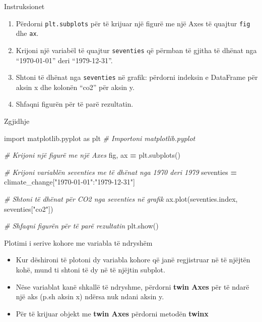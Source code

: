 \documentclass[
  ignorenonframetext,
]{beamer}
\newenvironment{Shaded}{\begin{snugshade}}{\end{snugshade}}
\newcommand{\CommentTok}[1]{\textcolor[rgb]{0.56,0.35,0.01}{\textit{#1}}}
\newcommand{\ImportTok}[1]{#1}
\newcommand{\NormalTok}[1]{#1}
\newcommand{\OperatorTok}[1]{\textcolor[rgb]{0.81,0.36,0.00}{\textbf{#1}}}
\newcommand{\StringTok}[1]{\textcolor[rgb]{0.31,0.60,0.02}{#1}}
\begin{document}
\begin{frame}[fragile]{Instruksionet}
\protect\hypertarget{instruksionet-6}{}
\begin{enumerate}
\item
  Përdorni \texttt{plt.subplots} për të krijuar një figurë me një Axes
  të quajtur \texttt{fig} dhe \texttt{ax}.
\item
  Krijoni një variabël të quajtur \texttt{seventies} që përmban të
  gjitha të dhënat nga ``1970-01-01'' deri ``1979-12-31''.
\item
  Shtoni të dhënat nga \texttt{seventies} në grafik: përdorni indeksin e
  DataFrame për aksin x dhe kolonën ``co2'' për aksin y.
\item
  Shfaqni figurën për të parë rezultatin.
\end{enumerate}
\end{frame}

\begin{frame}[fragile]{Zgjidhje}
\protect\hypertarget{zgjidhje-6}{}

\begin{Shaded}
\begin{Highlighting}[]
\ImportTok{import}\NormalTok{ matplotlib.pyplot }\ImportTok{as}\NormalTok{ plt  }\CommentTok{\# Importoni matplotlib.pyplot}

\CommentTok{\# Krijoni një figurë me një Axes}
\NormalTok{fig, ax }\OperatorTok{=}\NormalTok{ plt.subplots()}

\CommentTok{\# Krijoni variablën \textquotesingle{}seventies\textquotesingle{} me të dhënat nga 1970 deri 1979}
\NormalTok{seventies }\OperatorTok{=}\NormalTok{ climate\_change[}\StringTok{"1970{-}01{-}01"}\NormalTok{:}\StringTok{"1979{-}12{-}31"}\NormalTok{]}

\CommentTok{\# Shtoni të dhënat për CO2 nga \textquotesingle{}seventies\textquotesingle{} në grafik}
\NormalTok{ax.plot(seventies.index, seventies[}\StringTok{"co2"}\NormalTok{])}

\CommentTok{\# Shfaqni figurën për të parë rezultatin}
\NormalTok{plt.show()}
\end{Highlighting}
\end{Shaded}
\end{frame}

\begin{frame}{Plotimi i serive kohore me variabla të ndryshëm}
\protect\hypertarget{plotimi-i-serive-kohore-me-variabla-tuxeb-ndryshuxebm}{}
\begin{itemize}
\item
  Kur dëshironi të plotoni dy variabla kohore që janë regjistruar në të
  njëjtën kohë, mund ti shtoni të dy në të njëjtin subplot.
\item
  Nëse variablat kanë shkallë të ndryshme, përdorni \textbf{twin Axes}
  për të ndarë një aks (p.sh aksin x) ndërsa nuk ndani aksin y.
\item
  Për të krijuar objekt me \textbf{twin Axes} përdorni metodën
  \textbf{twinx}
\end{itemize}
\end{frame}
\end{document}

